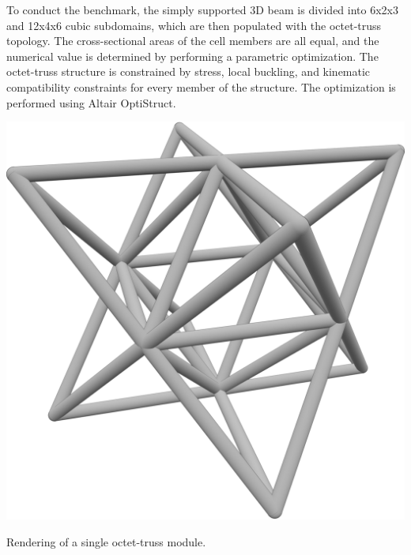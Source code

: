 To conduct the benchmark, the simply supported 3D beam is divided into 6x2x3 and 12x4x6 cubic subdomains, which are then populated with the octet-truss topology. The cross-sectional areas of the cell members are all equal, and the numerical value is determined by performing a parametric optimization. The octet-truss structure is constrained by stress, local buckling, and kinematic compatibility constraints for every member of the structure. The optimization is performed using Altair OptiStruct.


\begin{marginfigure}
    \centering
    \includegraphics[width=0.7\linewidth]{figures/05_cellular_opt/00_octet/05_Cell__Topology_NLP_iso.png}
    \caption{Rendering of a single octet-truss module.}
    \label{fig:05_octet_module}
\end{marginfigure}

